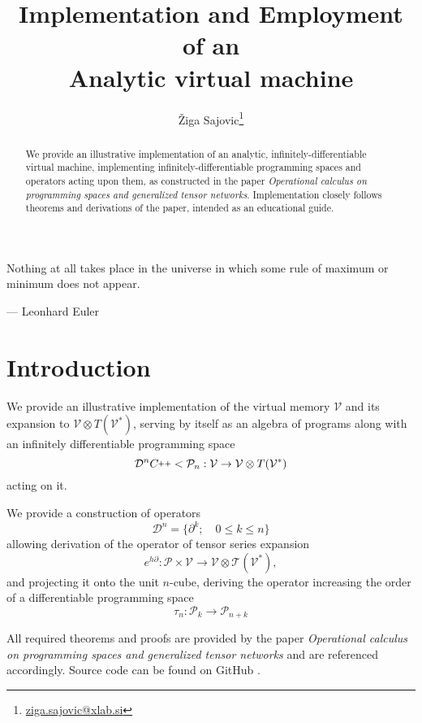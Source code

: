 \documentclass{article}
\title{Implementation and Employment\protect \\of an \protect \\ Analytic virtual machine}
\author{Žiga Sajovic\footnote{\href{mail.to:ziga.sajovic@xlab.si}{ziga.sajovic@xlab.si}}}
\newcommand{\T}{\mathcal{T}}
\newcommand{\VV}{\mathcal{V}}
\newcommand{\CC}{C\nolinebreak\hspace{-.05em}\raisebox{.4ex}{\tiny\bf +}\nolinebreak\hspace{-.10em}\raisebox{.4ex}{\tiny\bf +}}
\def\CC{{C\nolinebreak[4]\hspace{-.05em}\raisebox{.4ex}{\tiny\bf ++}}}
\newcommand{\dP}{\mathcal{P}}
\newcommand{\D}{\partial}
\newcommand{\DD}{\mathcal{D}}
\newcommand{\sumd}{\tau}
\begin{document}
\maketitle

\begin{abstract}
We provide an illustrative implementation of an analytic, infinitely-differentiable virtual machine, implementing infinitely-differentiable programming spaces and operators acting upon them, as constructed in the paper \emph{Operational calculus on programming spaces and generalized tensor networks}\cite{OperationalCalculus}. Implementation closely follows theorems and derivations of the paper, intended as an educational guide.
\end{abstract}

\epigraph{Nothing at all takes place in the universe in which some rule of maximum or minimum does not appear.}{--- \textup{Leonhard Euler}}
\clearpage
\tableofcontents
\clearpage
\section{Introduction}
We provide an illustrative implementation of the virtual memory $\VV$ and its expansion to $\VV\otimes T(\VV^*)$, serving by itself as an algebra of programs along with an infinitely differentiable programming space \cite[Theorem~5.1]{OperationalCalculus}
\begin{equation}
\DD^n\CC<\dP_n:\VV\to\VV\otimes T(\VV^*)
\end{equation}
acting on it.

We provide a construction of operators
\begin{equation}
\DD^n=\{\D^k;\quad 0\le k\le n\}
\end{equation}
allowing derivation of the operator of tensor series expansion \cite[Theorem~5.4]{OperationalCalculus}
 \begin{equation}
                  	e^{h\D}:\dP\times \VV\to \VV\otimes \T(\VV^*),
         \end{equation}
and projecting it onto the unit $n$-cube, deriving the operator increasing the order of a differentiable programming space \cite[Corollary~5.2]{OperationalCalculus}
\begin{equation}\label{eq:sumd}
\sumd_n:\dP_k\to\dP_{n+k}
\end{equation} 

All required theorems and proofs are provided by the paper \emph{Operational calculus on programming spaces and generalized tensor networks} \cite{OperationalCalculus} and are referenced accordingly. Source code can be found on GitHub \cite{dCpp}.
\end{document}
